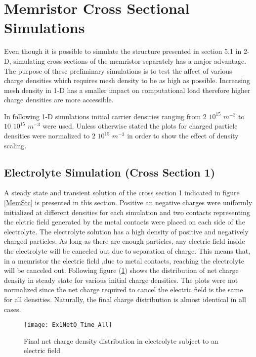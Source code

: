 \clearpage
\section{Memristor Cross Sectional Simulations}

Even though it is possible to simulate the structure presented in section 5.1 in 2-D, simulating cross sections of the memristor separately has a major advantage. The purpose of these preliminary  simulations is to test the affect of various charge densities which requires mesh density to be as high as possible. Increasing mesh density in 1-D has a smaller impact on computational load therefore higher charge densities are more accessible.  

In following 1-D simulations initial carrier densities ranging from $2$ $10^{15}$ $m^{-3}$ to $10$ $10^{15}$ $m^{-3}$ were used. Unless otherwise stated the plots for charged particle densities were normalized to $2$ $10^{15}$ $m^{-3}$ in order to show the effect of density scaling. 

\subsection{Electrolyte Simulation (Cross Section 1)}

A steady state and transient solution of the cross section 1 indicated in figure \ref{MemStc} is presented in this section. Positive an negative charges were uniformly initialized at different densities for each simulation and two contacts representing the elctric field generated by the metal contacts were placed on each side of the electrolyte. The electrolyte solution has a high density of positive and negatively charged particles. As long as there are enough particles, any electric field inside the electrolyte will be canceled out due to separation of charge. This means that, in a memristor the electric field ,due to metal contacts, reaching the electrolyte will be canceled out. Following figure (\ref{ElectrolyteQ}) shows the distribution of net charge density in steady state for various initial charge densities.  The plots were not normalized since the net charge required to cancel the electric field is the same for all densities. Naturally, the final charge distribution is almost identical in all cases.

\begin{figure}[htp]
\centering
\texttt{[image: Ex1NetQ\_Time\_All]}
\caption{Final net charge density distribution in electrolyte subject to an electric field} 
\label{ElectrolyteQ}
\end{figure}

